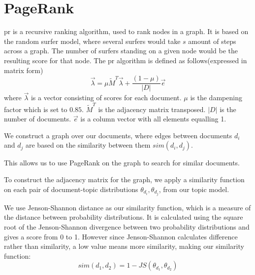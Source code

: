 \section{PageRank}\label{sec:pagerank}
\gls{pr} is a recursive ranking algorithm, used to rank nodes in a graph.
It is based on the random surfer model, where several surfers would take $s$ amount of steps across a graph.
The number of surfers standing on a given node would be the resulting score for that node.
The \gls{pr} algorithm is defined as follows(expressed in matrix form)
$$ \overrightarrow{\lambda} = \mu \widetilde{M}^T \overrightarrow{\lambda} + \frac{(1-\mu)}{|D|} \overrightarrow{e} $$  
where $\overrightarrow{\lambda}$ is a vector consisting of scores for each document. 
$\mu$ is the dampening factor which is set to $0.85$.
$\widetilde{M}^T$ is the adjacency matrix transposed.
$|D|$ is the number of documents.
$\overrightarrow{e}$ is a column vector with all elements equalling 1.

We construct a graph over our documents, where edges between documents $d_i$ and $d_j$ are based on the similarity between them $sim(d_i, d_j)$.

This allows us to use PageRank on the graph to search for similar documents.

To construct the adjacency matrix for the graph, we apply a similarity function on each pair of document-topic distributions $\theta_{d_i}, \theta_{d_j}$, from our topic model.

We use Jenson-Shannon distance as our similarity function, which is a measure of the distance between probability distributions\cite{jensen-shannon2003}\cite{jensen-shannondis2003}.
It is calculated using the square root of the Jenson-Shannon divergence between two probability distributions and gives a score from 0 to 1.
However since Jenson-Shannon calculates difference rather than similarity, a low value means more similarity, making our similarity function:
$$sim(d_1, d_2) = 1 - JS(\theta_{d_1}, \theta_{d_2})$$


